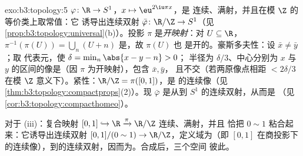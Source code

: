 \begin{solution}{exo:b3:topology:5}
$\varphi \colon \R \to S^1$，$x \mapsto \eu^{2\iu\pi x}$，是
连续、满射，并且在模 $\Z$ 的等价类上取常值：它
诱导出连续双射 $\bar\varphi \colon \R/\Z \to
S^1$（见\cref{prop:b3:topology:universal}(b)）。投影
$\pi$ 是\emph{开映射}：对 $U \subseteq \R$，
$\pi^{-1}(\pi(U)) = \bigcup_{n}(U + n)$ 是，故 $\pi(U)$ 也
是开的。豪斯多夫性：设 $\bar x \neq \bar y$；取
代表元，使 $\delta = \min_{n}\abs{x - y - n} > 0$；
半径为 $\delta/3$、中心分别为 $x$ 与
$y$ 的区间的像是（因 $\pi$ 为开映射），包含 $\bar x, \bar y$，
且不交（若两原像点相距 $< 2\delta/3$
在模 $\Z$ 意义下）。紧性：$\R/\Z = \pi([0,1])$，是
的连续像（见\cref{thm:b3:topology:compactprops}(2)）。现
$\bar\varphi$ 是从到
 $S^1$ 的连续双射，从而是
（见\cref{cor:b3:topology:compacthomeo}）。

对于 (iii)：复合映射 $[0,1] \hookrightarrow \R
\xrightarrow{\pi} \R/\Z$ 连续、满射，并且
恰把 $0 \sim 1$ 粘合起来：它诱导出连续双射
$[0,1]/(0\sim1) \to \R/\Z$，定义域为（即
$[0,1]$ 在商投影下的连续像），到的连续双射，因而为。合成后，三个空间
彼此。
\end{solution}

